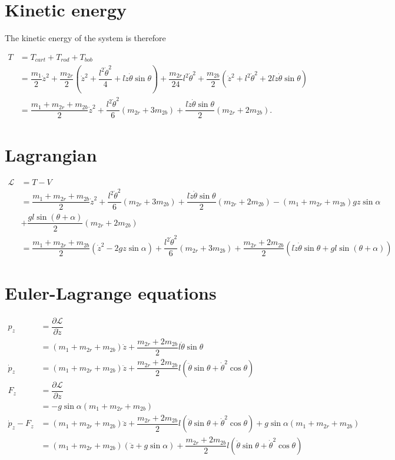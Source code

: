 \documentclass[12pt,a4paper,portrait]{article}
\begin{document}
	\section{Kinetic energy}
	The kinetic energy of the system is therefore
	
	\begin{align*}
		T &= T_{cart} + T_{rod} + T_{bob} \\
		&= \dfrac{m_1}{2} \dot{z}^2 + \dfrac{m_{2r}}{2}\left(\dot{z}^2+\dfrac{l^2\dot{\theta}^2}{4}+l\dot{z}\dot{\theta}\sin{\theta}\right)+\dfrac{m_{2r}}{24}l^2\dot{\theta}^2 + \dfrac{m_{2b}}{2}(\dot{z}^2+l^2\dot{\theta}^2+2l\dot{z}\dot{\theta}\sin{\theta})\\
		&= \dfrac{m_1+m_{2r}+m_{2b}}{2}\dot{z}^2 + \dfrac{l^2\dot{\theta}^2}{6}(m_{2r}+3m_{2b}) + \dfrac{l\dot{z}\dot{\theta}\sin{\theta}}{2}(m_{2r}+2m_{2b}).
	\end{align*}
	
	\section{Lagrangian}
	\begin{align*}
		\mathcal{L} &= T - V\\
		&= \dfrac{m_1+m_{2r}+m_{2b}}{2}\dot{z}^2 + \dfrac{l^2\dot{\theta}^2}{6}(m_{2r}+3m_{2b}) + \dfrac{l\dot{z}\dot{\theta}\sin{\theta}}{2}(m_{2r}+2m_{2b}) - (m_1+m_{2r}+m_{2b})gz\sin{\alpha}\\ &+\dfrac{gl\sin{(\theta+\alpha)}}{2}(m_{2r}+2m_{2b})\\
		&= \dfrac{m_1+m_{2r}+m_{2b}}{2}(\dot{z}^2 - 2gz\sin{\alpha})+\dfrac{l^2\dot{\theta}^2}{6}(m_{2r}+3m_{2b}) + \dfrac{m_{2r}+2m_{2b}}{2}\left(l\dot{z}\dot{\theta}\sin{\theta}+gl\sin{(\theta+\alpha)}\right)
	\end{align*}
	
	\section{Euler-Lagrange equations}
	\begin{align*}
		p_{z} &= \dfrac{\partial \mathcal{L}}{\partial \dot{z}} \\
		&= (m_1+m_{2r}+m_{2b})\dot{z} + \dfrac{m_{2r}+2m_{2b}}{2}l\dot{\theta}\sin{\theta} \\
		\dot{p}_{z} &= (m_1+m_{2r}+m_{2b})\ddot{z} + \dfrac{m_{2r}+2m_{2b}}{2}l\left(\ddot{\theta}\sin{\theta} + \dot{\theta}^2\cos{\theta}\right) \\
		F_{z} &= \dfrac{\partial \mathcal{L}}{\partial z} \\
		&= -g\sin{\alpha}(m_1+m_{2r}+m_{2b}) \\
		\dot{p}_{z} - F_z &= (m_1+m_{2r}+m_{2b})\ddot{z} + \dfrac{m_{2r}+2m_{2b}}{2}l\left(\ddot{\theta}\sin{\theta} + \dot{\theta}^2\cos{\theta}\right) +g\sin{\alpha}(m_1+m_{2r}+m_{2b}) \\
		&= (m_1+m_{2r}+m_{2b})(\ddot{z} + g\sin{\alpha}) + \dfrac{m_{2r}+2m_{2b}}{2}l\left(\ddot{\theta}\sin{\theta} + \dot{\theta}^2\cos{\theta}\right)
	\end{align*}
	
\end{document}
